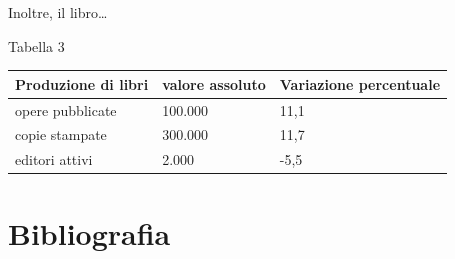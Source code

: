 \documentclass[
]{book}
\begin{document}
Inoltre, il libro\ldots{}

Tabella 3

\begin{longtable}[]{@{}lll@{}}
\toprule\noalign{}
Produzione di libri & valore assoluto & Variazione percentuale \\
\midrule\noalign{}
\endhead
\bottomrule\noalign{}
\endlastfoot
opere pubblicate & 100.000 & 11,1 \\
copie stampate & 300.000 & 11,7 \\
editori attivi & 2.000 & -5,5 \\
\end{longtable}

\hypertarget{bibliografia}{%
\chapter{Bibliografia}\label{bibliografia}}

  
\end{document}
